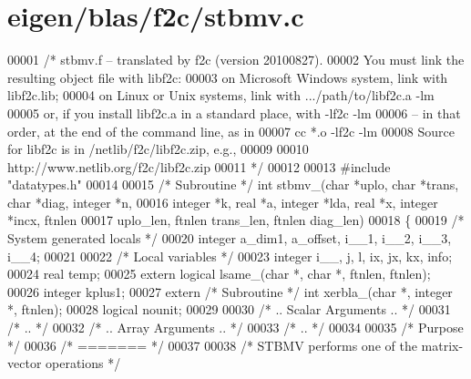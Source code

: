 \hypertarget{eigen_2blas_2f2c_2stbmv_8c_source}{}\section{eigen/blas/f2c/stbmv.c}
\label{eigen_2blas_2f2c_2stbmv_8c_source}

\begin{DoxyCode}
00001 \textcolor{comment}{/* stbmv.f -- translated by f2c (version 20100827).}
00002 \textcolor{comment}{   You must link the resulting object file with libf2c:}
00003 \textcolor{comment}{    on Microsoft Windows system, link with libf2c.lib;}
00004 \textcolor{comment}{    on Linux or Unix systems, link with .../path/to/libf2c.a -lm}
00005 \textcolor{comment}{    or, if you install libf2c.a in a standard place, with -lf2c -lm}
00006 \textcolor{comment}{    -- in that order, at the end of the command line, as in}
00007 \textcolor{comment}{        cc *.o -lf2c -lm}
00008 \textcolor{comment}{    Source for libf2c is in /netlib/f2c/libf2c.zip, e.g.,}
00009 \textcolor{comment}{}
00010 \textcolor{comment}{        http://www.netlib.org/f2c/libf2c.zip}
00011 \textcolor{comment}{*/}
00012 
00013 \textcolor{preprocessor}{#include "datatypes.h"}
00014 
00015 \textcolor{comment}{/* Subroutine */} \textcolor{keywordtype}{int} stbmv\_(\textcolor{keywordtype}{char} *uplo, \textcolor{keywordtype}{char} *trans, \textcolor{keywordtype}{char} *diag, integer *n, 
00016     integer *k, real *a, integer *lda, real *x, integer *incx, ftnlen 
00017     uplo\_len, ftnlen trans\_len, ftnlen diag\_len)
00018 \{
00019     \textcolor{comment}{/* System generated locals */}
00020     integer a\_dim1, a\_offset, i\_\_1, i\_\_2, i\_\_3, i\_\_4;
00021 
00022     \textcolor{comment}{/* Local variables */}
00023     integer i\_\_, j, l, ix, jx, kx, info;
00024     real temp;
00025     \textcolor{keyword}{extern} logical lsame\_(\textcolor{keywordtype}{char} *, \textcolor{keywordtype}{char} *, ftnlen, ftnlen);
00026     integer kplus1;
00027     \textcolor{keyword}{extern} \textcolor{comment}{/* Subroutine */} \textcolor{keywordtype}{int} xerbla\_(\textcolor{keywordtype}{char} *, integer *, ftnlen);
00028     logical nounit;
00029 
00030 \textcolor{comment}{/*     .. Scalar Arguments .. */}
00031 \textcolor{comment}{/*     .. */}
00032 \textcolor{comment}{/*     .. Array Arguments .. */}
00033 \textcolor{comment}{/*     .. */}
00034 
00035 \textcolor{comment}{/*  Purpose */}
00036 \textcolor{comment}{/*  ======= */}
00037 
00038 \textcolor{comment}{/*  STBMV  performs one of the matrix-vector operations */}

\end{DoxyCode}
